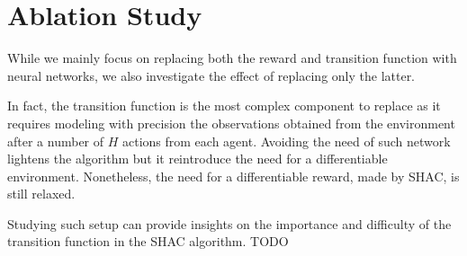 \section{Ablation Study}\label{sect:ablation}
While we mainly focus on replacing both the reward and transition function with neural networks, we also investigate the effect of replacing only the latter. 

In fact, the transition function is the most complex component to replace as it requires modeling with precision the observations obtained from the environment after a number of $H$ actions from each agent. Avoiding the need of such network lightens the algorithm but it reintroduce the need for a differentiable environment. Nonetheless, the need for a differentiable reward, made by SHAC, is still relaxed.

Studying such setup can provide insights on the importance and difficulty of the transition function in the SHAC algorithm. TODO 
